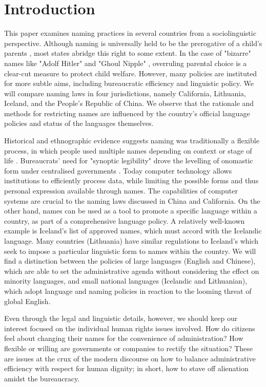 \section{Introduction}

This paper examines naming practices in several countries from a sociolinguistic
perspective. Although naming is universally held to be the prerogative of a
child's parents \parencite{alford87}, most states abridge this right to some
extent. In the case of "bizarre" names like "Adolf Hitler" and "Ghoul Nipple"
\parencite{larson11}, overruling parental choice is a clear-cut measure to
protect child welfare. However, many policies are instituted for more subtle
aims, including bureaucratic efficiency and linguistic policy. We will compare
naming laws in four jurisdictions, namely California, Lithuania, Iceland, and
the People's Republic of China. We observe that the rationale and methods for
restricting names are influenced by the country's official language policies and
status of the languages themselves.

Historical and ethnographic evidence suggests naming was traditionally a
flexible process, in which people used multiple names depending on context or
stage of life \parencite{alford87} \parencite{scott02}. Bureaucrats' need for
"synoptic legibility" drove the levelling of onomastic form under centralised
governments \parencite{scott02}. Today computer technology allows institutions
to efficiently process data, while limiting the possible forms and thus personal
expression available through names. The capabilities of computer systems are
crucial to the naming laws discussed in China and California. On the other hand,
names can be used as a tool to promote a specific language within a country, as
part of a comprehensive language policy. A relatively well-known example is
Iceland's list of approved names, which must accord with the Icelandic language.
Many countries (Lithuania) have similar regulations to Iceland's which seek to
impose a particular linguistic form to names within the country. We will find a
distinction between the policies of large languages (English and Chinese), which
are able to set the administrative agenda without considering the effect on
minority languages, and small national languages (Icelandic and Lithuanian),
which adopt language and naming policies in reaction to the looming threat of
global English.

Even through the legal and linguistic details, however, we should keep our
interest focused on the individual human rights issues involved. How do citizens
feel about changing their names for the convenience of administration? How
flexible or willing are governments or companies to rectify the situation? These
are issues at the crux of the modern discourse on how to balance administrative
efficiency with respect for human dignity; in short, how to stave off alienation
amidst the bureaucracy.


